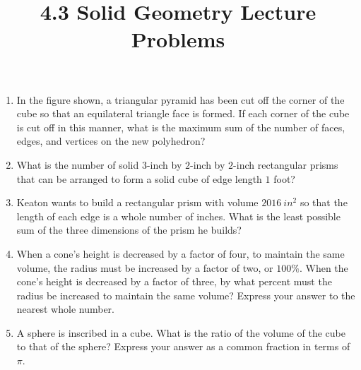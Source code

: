 \documentclass{article}
\title{4.3 Solid Geometry Lecture Problems}
\author{}
\date{}
\begin{document}
\maketitle

\begin{enumerate}
    \item In the figure shown, a triangular pyramid has been cut off the corner of the cube so that an equilateral triangle face is formed.
        If each corner of the cube is cut off in this manner, what is the maximum sum of the number of faces, edges, and vertices on the new polyhedron?
        \begin{center}
        \end{center}
    \vspace{0.5cm}
    \item What is the number of solid $3$-inch by $2$-inch by $2$-inch rectangular prisms that can be arranged to form a solid cube of edge length $1$ foot?
        \vspace{3cm}
    \item Keaton wants to build a rectangular prism with volume $\SI{2016}{in^2}$ so that the length of each edge is a whole number of inches.
        What is the least possible sum of the three dimensions of the prism he builds?
    \vspace{3cm}
    \item When a cone's height is decreased by a factor of four, to maintain the same volume, the radius must be increased by a factor of two, or $100\%$.
        When the cone's height is decreased by a factor of three, by what percent must the radius be increased to maintain the same volume?
        Express your answer to the nearest whole number.
    \vspace{3cm}
    \item A sphere is inscribed in a cube.
        What is the ratio of the volume of the cube to that of the sphere?
        Express your answer as a common fraction in terms of $\pi$.
\vspace{3cm}
\end{enumerate}
\end{document}

